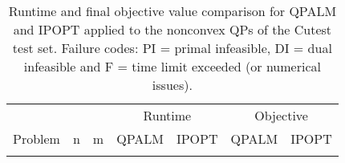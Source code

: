 \documentclass{amsart}
\begin{document}
{\small
	\begin{longtable}[ht]{lcc|cc|cc}
		& & & \multicolumn{2}{c}{Runtime} & \multicolumn{2}{c}{Objective} \\
		\multicolumn{1}{l}{Problem} & n & m & QPALM & IPOPT & QPALM & IPOPT \\
		\hline
		
		\caption{%
			Runtime and final objective value comparison for QPALM and IPOPT applied to the nonconvex QPs of the Cutest test set. Failure codes: PI = primal infeasible, DI = dual infeasible and F = time limit exceeded (or numerical issues).%
		}%
	\end{longtable}
}
\end{document}
